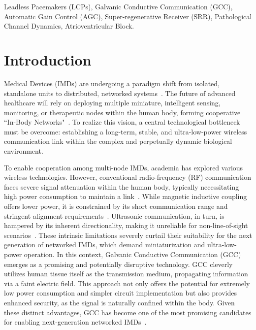 \documentclass[journal]{IEEEtran}
\begin{document}
\begin{IEEEkeywords}
Leadless Pacemakers (LCPs), Galvanic Conductive Communication (GCC), Automatic Gain Control (AGC), Super-regenerative Receiver (SRR), Pathological Channel Dynamics, Atrioventricular Block.
\end{IEEEkeywords}


\section{Introduction}
\label{sec:introduction}

 Medical Devices (IMDs) are undergoing a paradigm shift from isolated, standalone units to distributed, networked systems~\cite{Ferguson2011WirelessCW,zrenner2002will,laizou1999signal,Germanovix2000DesignOA}. The future of advanced healthcare will rely on deploying multiple miniature, intelligent sensing, monitoring, or therapeutic nodes within the human body, forming cooperative ``In-Body Networks"~\cite{estudillo2010intrabody,warren2010wireless,lin2014design}. To realize this vision, a central technological bottleneck must be overcome: establishing a long-term, stable, and ultra-low-power wireless communication link within the complex and perpetually dynamic biological environment.

To enable cooperation among multi-node IMDs, academia has explored various wireless technologies. However, conventional radio-frequency (RF) communication faces severe signal attenuation within the human body, typically necessitating high power consumption to maintain a link~\cite{bose2018rf}. While magnetic inductive coupling offers lower power, it is constrained by its short communication range and stringent alignment requirements~\cite{li2018200mb}. Ultrasonic communication, in turn, is hampered by its inherent directionality, making it unreliable for non-line-of-sight scenarios~\cite{seyedi2013survey}. These intrinsic limitations severely curtail their suitability for the next generation of networked IMDs, which demand miniaturization and ultra-low-power operation. In this context, Galvanic Conductive Communication (GCC) emerges as a promising and potentially disruptive technology. GCC cleverly utilizes human tissue itself as the transmission medium, propagating information via a faint electric field. This approach not only offers the potential for extremely low power consumption and simpler circuit implementation but also provides enhanced security, as the signal is naturally confined within the body. Given these distinct advantages, GCC has become one of the most promising candidates for enabling next-generation networked IMDs~\cite{wu2020equivalent, opie2004heart, Wegmueller2010Signal, 2016Galvanically}.
\end{document}
